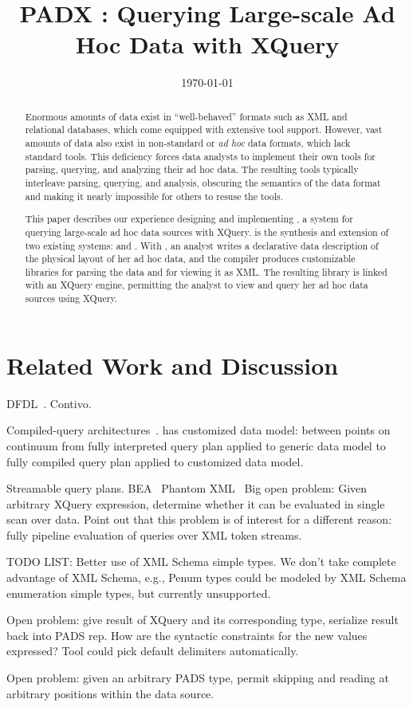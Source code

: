 \documentclass[nocopyrightspace]{sigplanconf}
\title{PADX : Querying Large-scale Ad Hoc Data with XQuery}
\date{\today}
\begin{document}
\maketitle
\begin{abstract}
Enormous amounts of data exist in ``well-behaved'' formats
such as XML and relational databases, which come equipped with
extensive tool support.  However,  vast amounts of data also exist
in non-standard or \textit{ad hoc} data formats, which lack standard
tools. This deficiency forces data analysts to implement their own tools for
parsing, querying, and analyzing their ad hoc data.  The 
resulting tools typically interleave parsing, querying, and analysis,
obscuring the semantics of the data format and making it nearly
impossible for others to resuse the tools.

This paper describes our experience designing and implementing
\padx{}, a system for querying large-scale ad hoc data sources with
XQuery.  \padx{} is the synthesis and extension of two existing
systems: \pads{} and \Galax{}. With \padx{}, an analyst writes a
declarative data description of the physical layout of her ad hoc
data, and the \pads{} compiler produces customizable libraries for
parsing the data and for viewing it as XML.  The resulting library is
linked with an XQuery engine, permitting the analyst to view and query
her ad hoc data sources using XQuery.
\end{abstract}







\section{Related Work and Discussion}
\label{section:relatedwork}
\label{section:future}

DFDL~\cite{dfdl}. Contivo.  

Compiled-query architectures~\cite{daytona}.  \padx{} has customized
data model: between points on continuum from fully interpreted query
plan applied to generic data model to fully compiled query plan
applied to customized data model.

Streamable query plans. 
BEA~\cite{DBLP:journals/vldb/FlorescuHKLRWCS04}
Phantom XML~\cite{rose:villard:2005}
Big open problem: Given arbitrary XQuery expression, determine whether
it can be evaluated in single scan over data.  Point out that this
problem is of interest for a different reason: fully pipeline
evaluation of queries over XML token streams.

TODO LIST: Better use of XML Schema simple types.
We don't take complete advantage of XML Schema, e.g., Penum types
could be modeled by XML Schema enumeration simple types, but currently
unsupported.

Open problem: give result of XQuery and its corresponding type,
serialize result back into PADS rep.  How are the syntactic
constraints for the new values expressed?  Tool could pick default
delimiters automatically. 

Open problem: given an arbitrary PADS type, permit skipping and
reading at arbitrary positions within the data source. 


\small
 
\end{document}
